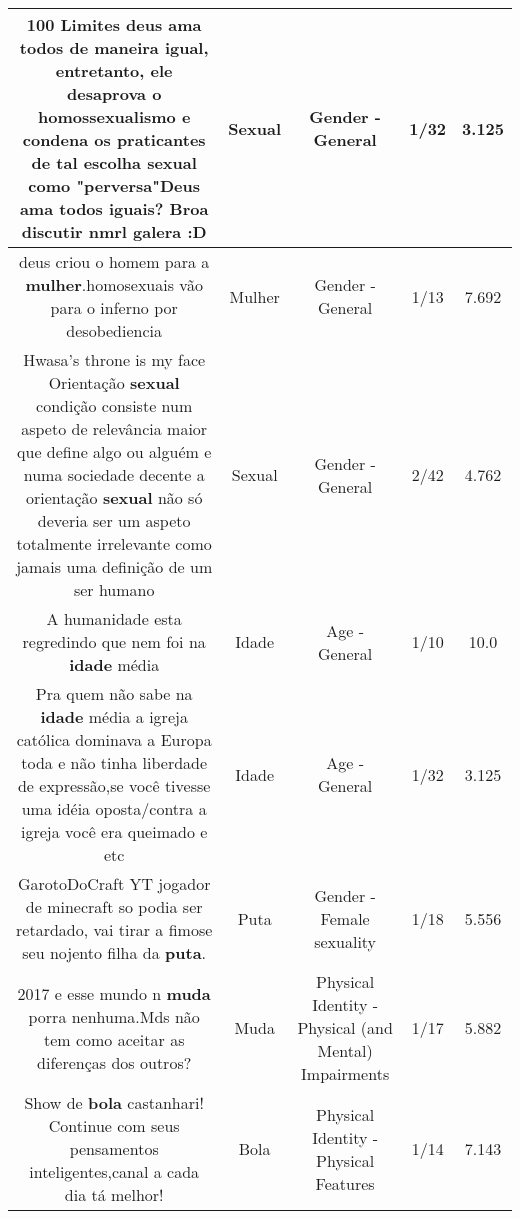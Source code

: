 \documentclass[11pt]{article}
\newlength\mylength
\begin{document}
\begin{center}
\begin{longtable}{|C{.65\mylength}|C{.30\mylength}|C{.12\mylength}|C{.12\mylength}|C{.12\mylength}|}
  \small 100 Limites deus ama todos de maneira igual, entretanto, ele desaprova o homossexualismo e condena os praticantes de tal escolha \textbf{sexual} como "perversa"Deus ama todos iguais? Broa discutir nmrl galera :D\normalsize   & Sexual & Gender - General & 1/32 & 3.125 \\  \hline
  \small deus criou o homem para a \textbf{mulher}.homosexuais vão para o inferno por desobediencia\normalsize   & Mulher & Gender - General & 1/13 & 7.692 \\  \hline
  \small Hwasa's throne is my face Orientação \textbf{sexual} condição consiste num aspeto de relevância maior que define algo ou alguém e numa sociedade decente a orientação \textbf{sexual} não só deveria ser um aspeto totalmente irrelevante como jamais uma definição de um ser humano\normalsize   & Sexual & Gender - General & 2/42 & 4.762 \\  \hline
  \small A humanidade esta regredindo que nem foi na \textbf{idade} média\normalsize   & Idade & Age - General & 1/10 & 10.0 \\  \hline
  \small Pra quem não sabe na \textbf{idade} média a igreja católica dominava a Europa toda e não tinha liberdade de expressão,se você tivesse uma idéia oposta/contra a igreja você era queimado e etc\normalsize   & Idade & Age - General & 1/32 & 3.125 \\  \hline
  \small GarotoDoCraft YT jogador de minecraft so podia ser retardado, vai tirar a fimose seu nojento filha da \textbf{puta}.\normalsize   & Puta & Gender - Female sexuality & 1/18 & 5.556 \\  \hline
  \small 2017 e esse mundo n \textbf{muda} porra nenhuma.Mds não tem como aceitar as diferenças dos outros?\normalsize   & Muda & Physical Identity - Physical (and Mental) Impairments & 1/17 & 5.882 \\  \hline
  \small Show de \textbf{bola} castanhari! Continue com seus pensamentos inteligentes,canal a cada dia tá melhor!\normalsize   & Bola & Physical Identity - Physical Features & 1/14 & 7.143 \\  \hline

\end{longtable}
\end{center}
\end{document}
